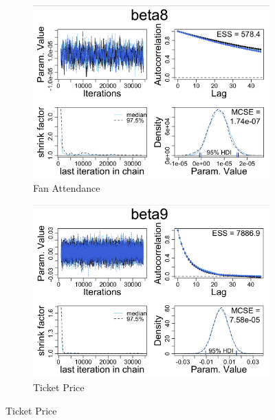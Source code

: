 \documentclass[12pt,english]{article}
\begin{document}
\begin{figure}[h]
 
\begin{subfigure}{0.5\textwidth}
\includegraphics[scale = 0.25]{beta8.png} 
\caption{Fan Attendance}
\label{fig:beta0}
\end{subfigure}
\begin{subfigure}{0.5\textwidth}
\includegraphics[scale = 0.25]{beta9.png}
\caption{Ticket Price}
\label{fig:subim2}
\end{subfigure}
\label{fig:beta1}
\end{figure}
\end{document}
